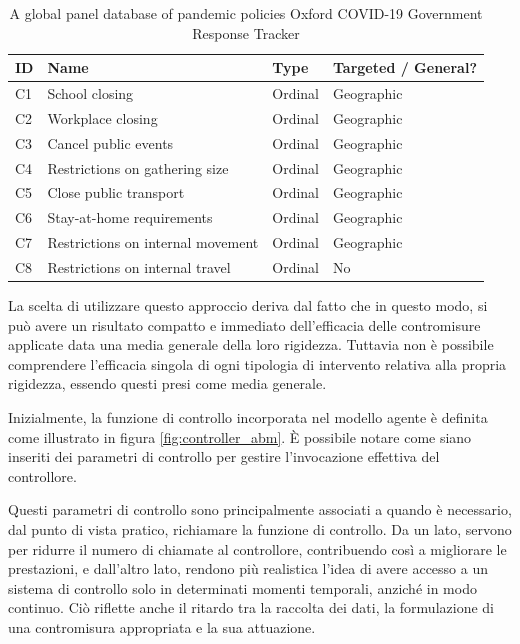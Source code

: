 \begin{table}[H]
    \centering
    \caption{A global panel database of pandemic policies Oxford COVID-19 Government Response Tracker \cite{Hale2021}}
    \begin{tabular}{|p{2.5cm}|p{2.5cm}|p{2.5cm}|p{2.5cm}|}
        \hline
        ID & Name & Type & Targeted / General? \\
        \hline
        C1 & School closing & Ordinal & Geographic \\
        \hline
        C2 & Workplace closing & Ordinal & Geographic \\
        \hline
        C3 & Cancel public events & Ordinal & Geographic \\
        \hline
        C4 & Restrictions on gathering size & Ordinal & Geographic \\
        \hline
        C5 & Close public transport & Ordinal & Geographic \\
        \hline
        C6 & Stay-at-home requirements & Ordinal & Geographic \\
        \hline
        C7 & Restrictions on internal movement & Ordinal & Geographic \\
        \hline
        C8 & Restrictions on internal travel & Ordinal & No \\
		\hline
    \end{tabular}
\end{table}

La scelta di utilizzare questo approccio deriva dal fatto che in 
questo modo, si può avere un risultato compatto e immediato 
dell'efficacia delle contromisure applicate data una media generale
della loro rigidezza. Tuttavia non è possibile comprendere l'efficacia
singola di ogni tipologia di intervento relativa alla propria rigidezza, 
essendo questi presi come media generale.

Inizialmente, la funzione di controllo incorporata nel modello 
agente è definita come illustrato in figura \ref{fig:controller_abm}. 
È possibile notare come siano inseriti dei parametri di controllo per 
gestire l'invocazione effettiva del controllore.

Questi parametri di controllo sono principalmente associati a quando 
è necessario, dal punto di vista pratico, richiamare la funzione di 
controllo. Da un lato, servono per ridurre il numero di chiamate al 
controllore, contribuendo così a migliorare le prestazioni, e 
dall'altro lato, rendono più realistica l'idea di avere accesso a 
un sistema di controllo solo in determinati momenti temporali, 
anziché in modo continuo. Ciò riflette anche il ritardo tra la 
raccolta dei dati, la formulazione di una contromisura appropriata 
e la sua attuazione.

